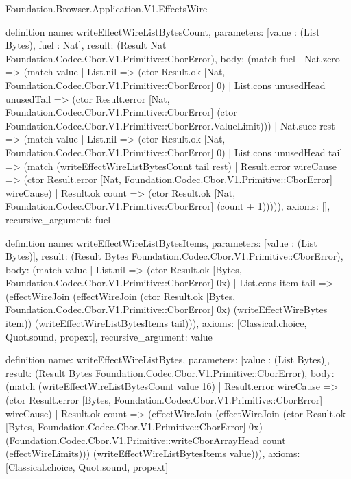 \begin{lexlean}{Foundation.Browser.Application.V1.EffectsWire}
\begin{semanticmodule}
definition{
  name: writeEffectWireListBytesCount,
  parameters: [value : (List Bytes), fuel : Nat],
  result: (Result Nat Foundation.Codec.Cbor.V1.Primitive::CborError),
  body: (match fuel
    | Nat.zero => (match value
      | List.nil => (ctor Result.ok [Nat, Foundation.Codec.Cbor.V1.Primitive::CborError] 0)
      | List.cons unusedHead unusedTail => (ctor Result.error [Nat, Foundation.Codec.Cbor.V1.Primitive::CborError] (ctor Foundation.Codec.Cbor.V1.Primitive::CborError.ValueLimit)))
    | Nat.succ rest => (match value
      | List.nil => (ctor Result.ok [Nat, Foundation.Codec.Cbor.V1.Primitive::CborError] 0)
      | List.cons unusedHead tail => (match (writeEffectWireListBytesCount tail rest)
        | Result.error wireCause => (ctor Result.error [Nat, Foundation.Codec.Cbor.V1.Primitive::CborError] wireCause)
        | Result.ok count => (ctor Result.ok [Nat, Foundation.Codec.Cbor.V1.Primitive::CborError] (count + 1))))),
  axioms: [],
  recursive_argument: fuel
}

definition{
  name: writeEffectWireListBytesItems,
  parameters: [value : (List Bytes)],
  result: (Result Bytes Foundation.Codec.Cbor.V1.Primitive::CborError),
  body: (match value
    | List.nil => (ctor Result.ok [Bytes, Foundation.Codec.Cbor.V1.Primitive::CborError] 0x)
    | List.cons item tail => (effectWireJoin (effectWireJoin (ctor Result.ok [Bytes, Foundation.Codec.Cbor.V1.Primitive::CborError] 0x) (writeEffectWireBytes item)) (writeEffectWireListBytesItems tail))),
  axioms: [Classical.choice, Quot.sound, propext],
  recursive_argument: value
}

definition{
  name: writeEffectWireListBytes,
  parameters: [value : (List Bytes)],
  result: (Result Bytes Foundation.Codec.Cbor.V1.Primitive::CborError),
  body: (match (writeEffectWireListBytesCount value 16)
    | Result.error wireCause => (ctor Result.error [Bytes, Foundation.Codec.Cbor.V1.Primitive::CborError] wireCause)
    | Result.ok count => (effectWireJoin (effectWireJoin (ctor Result.ok [Bytes, Foundation.Codec.Cbor.V1.Primitive::CborError] 0x) (Foundation.Codec.Cbor.V1.Primitive::writeCborArrayHead count (effectWireLimits))) (writeEffectWireListBytesItems value))),
  axioms: [Classical.choice, Quot.sound, propext]
}


\end{semanticmodule}
\end{lexlean}
